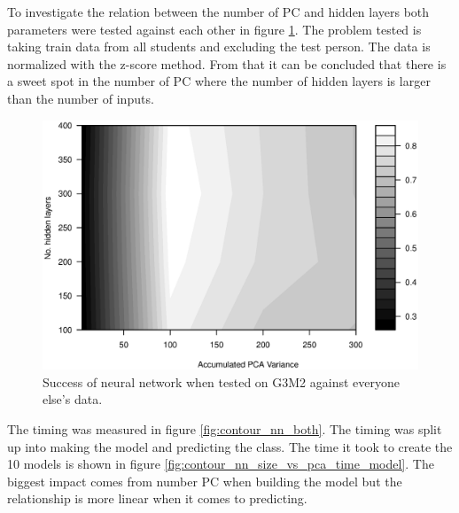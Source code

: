 

To investigate the relation between the number of PC and hidden layers both parameters were tested against each other in figure \ref{fig:contour_nn_size_vs_pca}. 
The problem tested is taking train data from all students and excluding the test person. 
The data is normalized with the z-score method.
From that it can be concluded that there is a sweet spot in the number of PC where the number of hidden layers is larger than the number of inputs.

\begin{figure}[h]
    \includegraphics[width=\textwidth]{graphics/contour_nn_size_vs_pca}
    \caption[Success of neural network, PC vs HL]{Success of neural network when tested on G3M2 against everyone else's data.}
    \label{fig:contour_nn_size_vs_pca}
\end{figure}

The timing was measured in figure \ref{fig:contour_nn_both}.
The timing was split up into making the model and predicting the class.
The time it took to create the 10 models is shown in figure \ref{fig:contour_nn_size_vs_pca_time_model}.
The biggest impact comes from number PC when building the model but the relationship is more linear when it comes to predicting.

